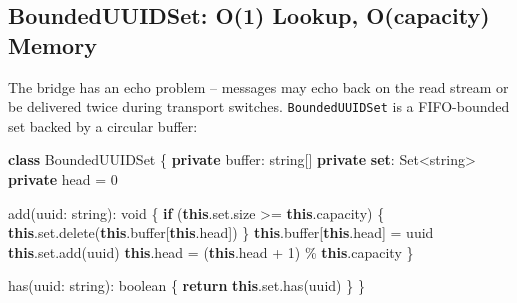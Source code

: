 \documentclass[
  english,
  11pt,
  letterpaper,
]{book}
\newenvironment{Shaded}{\begin{snugshade}}{\end{snugshade}}
\newcommand{\AttributeTok}[1]{\textcolor[rgb]{0.40,0.45,0.13}{#1}}
\newcommand{\BuiltInTok}[1]{\textcolor[rgb]{0.00,0.23,0.31}{#1}}
\newcommand{\ControlFlowTok}[1]{\textcolor[rgb]{0.00,0.23,0.31}{\textbf{#1}}}
\newcommand{\DataTypeTok}[1]{\textcolor[rgb]{0.68,0.00,0.00}{#1}}
\newcommand{\DecValTok}[1]{\textcolor[rgb]{0.68,0.00,0.00}{#1}}
\newcommand{\FunctionTok}[1]{\textcolor[rgb]{0.28,0.35,0.67}{#1}}
\newcommand{\KeywordTok}[1]{\textcolor[rgb]{0.00,0.23,0.31}{\textbf{#1}}}
\newcommand{\NormalTok}[1]{\textcolor[rgb]{0.00,0.23,0.31}{#1}}
\newcommand{\OperatorTok}[1]{\textcolor[rgb]{0.37,0.37,0.37}{#1}}
\begin{document}
\subsection{BoundedUUIDSet: O(1) Lookup, O(capacity)
Memory}\label{boundeduuidset-o1-lookup-ocapacity-memory}

The bridge has an echo problem -- messages may echo back on the read
stream or be delivered twice during transport switches.
\texttt{BoundedUUIDSet} is a FIFO-bounded set backed by a circular
buffer:

\begin{Shaded}
\begin{Highlighting}[]
\KeywordTok{class}\NormalTok{ BoundedUUIDSet \{}
  \KeywordTok{private}\NormalTok{ buffer}\OperatorTok{:} \DataTypeTok{string}\NormalTok{[]}
  \KeywordTok{private} \KeywordTok{set}\OperatorTok{:} \BuiltInTok{Set}\OperatorTok{\textless{}}\DataTypeTok{string}\OperatorTok{\textgreater{}}
  \KeywordTok{private}\NormalTok{ head }\OperatorTok{=} \DecValTok{0}

  \FunctionTok{add}\NormalTok{(uuid}\OperatorTok{:} \DataTypeTok{string}\NormalTok{)}\OperatorTok{:} \DataTypeTok{void}\NormalTok{ \{}
    \ControlFlowTok{if}\NormalTok{ (}\KeywordTok{this}\OperatorTok{.}\AttributeTok{set}\OperatorTok{.}\AttributeTok{size} \OperatorTok{\textgreater{}=} \KeywordTok{this}\OperatorTok{.}\AttributeTok{capacity}\NormalTok{) \{}
      \KeywordTok{this}\OperatorTok{.}\AttributeTok{set}\OperatorTok{.}\FunctionTok{delete}\NormalTok{(}\KeywordTok{this}\OperatorTok{.}\AttributeTok{buffer}\NormalTok{[}\KeywordTok{this}\OperatorTok{.}\AttributeTok{head}\NormalTok{])}
\NormalTok{    \}}
    \KeywordTok{this}\OperatorTok{.}\AttributeTok{buffer}\NormalTok{[}\KeywordTok{this}\OperatorTok{.}\AttributeTok{head}\NormalTok{] }\OperatorTok{=}\NormalTok{ uuid}
    \KeywordTok{this}\OperatorTok{.}\AttributeTok{set}\OperatorTok{.}\FunctionTok{add}\NormalTok{(uuid)}
    \KeywordTok{this}\OperatorTok{.}\AttributeTok{head} \OperatorTok{=}\NormalTok{ (}\KeywordTok{this}\OperatorTok{.}\AttributeTok{head} \OperatorTok{+} \DecValTok{1}\NormalTok{) }\OperatorTok{\%} \KeywordTok{this}\OperatorTok{.}\AttributeTok{capacity}
\NormalTok{  \}}

  \FunctionTok{has}\NormalTok{(uuid}\OperatorTok{:} \DataTypeTok{string}\NormalTok{)}\OperatorTok{:} \DataTypeTok{boolean}\NormalTok{ \{ }\ControlFlowTok{return} \KeywordTok{this}\OperatorTok{.}\AttributeTok{set}\OperatorTok{.}\FunctionTok{has}\NormalTok{(uuid) \}}
\NormalTok{\}}
\end{Highlighting}
\end{Shaded}
\end{document}
